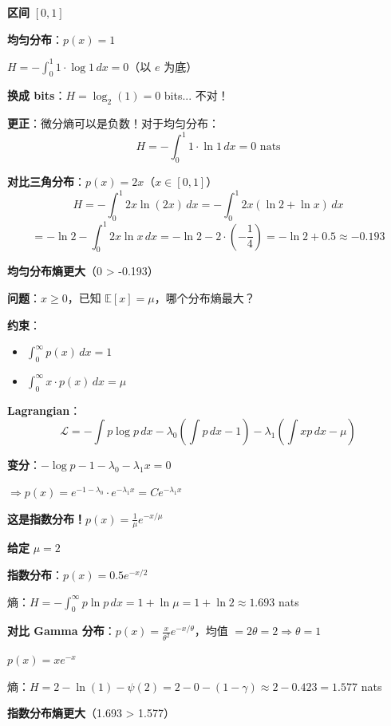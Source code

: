\documentclass[12pt, a4paper]{ctexart}
\begin{document}
\begin{blackboard}[例1数值验证]

\textbf{区间} $[0, 1]$

\textbf{均匀分布}：$p(x) = 1$

$H = -\int_0^1 1 \cdot \log 1 \, dx = 0$（以 $e$ 为底）

\textbf{换成 bits}：$H = \log_2(1) = 0$ bits... 不对！

\textbf{更正}：微分熵可以是负数！对于均匀分布：
\[
H = -\int_0^1 1 \cdot \ln 1 \, dx = 0 \text{ nats}
\]

\textbf{对比三角分布}：$p(x) = 2x$（$x \in [0,1]$）
\[
H = -\int_0^1 2x \ln(2x) \, dx = -\int_0^1 2x(\ln 2 + \ln x) \, dx
\]
\[
= -\ln 2 - \int_0^1 2x \ln x \, dx = -\ln 2 - 2 \cdot (-\frac{1}{4}) = -\ln 2 + 0.5 \approx -0.193
\]

\textbf{均匀分布熵更大}（0 > -0.193）

\end{blackboard}

\begin{blackboard}[例2：给定均值的最大熵]

\textbf{问题}：$x \geq 0$，已知 $\mathbb{E}[x] = \mu$，哪个分布熵最大？

\textbf{约束}：
\begin{itemize}
    \item $\int_0^\infty p(x) \, dx = 1$
    \item $\int_0^\infty x \cdot p(x) \, dx = \mu$
\end{itemize}

\textbf{Lagrangian}：
\[
\mathcal{L} = -\int p \log p \, dx - \lambda_0 \left( \int p \, dx - 1 \right) - \lambda_1 \left( \int xp \, dx - \mu \right)
\]

\textbf{变分}：$-\log p - 1 - \lambda_0 - \lambda_1 x = 0$

$\Rightarrow p(x) = e^{-1-\lambda_0} \cdot e^{-\lambda_1 x} = C e^{-\lambda_1 x}$

\textbf{这是指数分布！}$p(x) = \frac{1}{\mu} e^{-x/\mu}$

\end{blackboard}

\begin{blackboard}[例2数值验证]

\textbf{给定} $\mu = 2$

\textbf{指数分布}：$p(x) = 0.5 e^{-x/2}$

熵：$H = -\int_0^\infty p \ln p \, dx = 1 + \ln \mu = 1 + \ln 2 \approx \mathbf{1.693}$ nats

\textbf{对比 Gamma 分布}：$p(x) = \frac{x}{\theta^2} e^{-x/\theta}$，均值 $= 2\theta = 2 \Rightarrow \theta = 1$

$p(x) = x e^{-x}$

熵：$H = 2 - \ln(1) - \psi(2) = 2 - 0 - (1 - \gamma) \approx 2 - 0.423 = \mathbf{1.577}$ nats

\textbf{指数分布熵更大}（1.693 > 1.577）

\end{blackboard}
\end{document}
